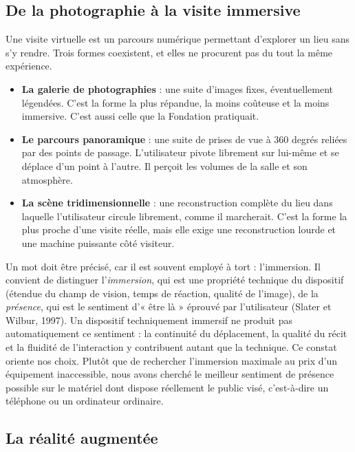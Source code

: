 \subsection{De la photographie à la visite immersive}

Une visite virtuelle est un parcours numérique permettant d'explorer un lieu
sans s'y rendre. Trois formes coexistent, et elles ne procurent pas du tout la
même expérience.

\begin{itemize}
  \item \textbf{La galerie de photographies} : une suite d'images fixes,
        éventuellement légendées. C'est la forme la plus répandue, la moins
        coûteuse et la moins immersive. C'est aussi celle que la Fondation
        pratiquait.
  \item \textbf{Le parcours panoramique} : une suite de prises de vue à
        360 degrés reliées par des points de passage. L'utilisateur pivote
        librement sur lui-même et se déplace d'un point à l'autre. Il perçoit
        les volumes de la salle et son atmosphère.
  \item \textbf{La scène tridimensionnelle} : une reconstruction complète du
        lieu dans laquelle l'utilisateur circule librement, comme il marcherait.
        C'est la forme la plus proche d'une visite réelle, mais elle exige une
        reconstruction lourde et une machine puissante côté visiteur.
\end{itemize}

Un mot doit être précisé, car il est souvent employé à tort : l'immersion. Il
convient de distinguer l'\emph{immersion}, qui est une propriété technique du
dispositif (étendue du champ de vision, temps de réaction, qualité de l'image),
de la \emph{présence}, qui est le sentiment d'« être là » éprouvé par
l'utilisateur (Slater et Wilbur, 1997). Un dispositif techniquement immersif ne
produit pas automatiquement ce sentiment : la continuité du déplacement, la
qualité du récit et la fluidité de l'interaction y contribuent autant que la
technique. Ce constat oriente nos choix. Plutôt que de rechercher l'immersion
maximale au prix d'un équipement inaccessible, nous avons cherché le meilleur
sentiment de présence possible sur le matériel dont dispose réellement le public
visé, c'est-à-dire un téléphone ou un ordinateur ordinaire.

\subsection{La réalité augmentée}

